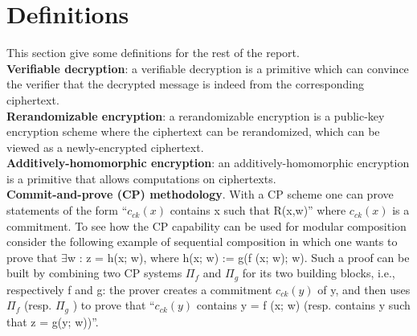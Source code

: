 \section{Definitions}
This section give some definitions for the rest of the report. \\

\textbf{Verifiable decryption}: a verifiable decryption \cite{verifiable_decryption} is a primitive which can convince the verifier that the decrypted message is indeed from the corresponding ciphertext. \\

\textbf{Rerandomizable encryption}: a rerandomizable encryption \cite{rerandomizable_rcca_encryption} is a public-key encryption scheme where the ciphertext can be rerandomized, which can be viewed as a newly-encrypted ciphertext. \\

\textbf{Additively-homomorphic encryption}: an additively-homomorphic encryption is a primitive that allows computations on ciphertexts. \\

\textbf{Commit-and-prove (CP) methodology}. With a CP scheme one can
prove statements of the form “$c_{ck}(x)$ contains x such that R(x,w)” where $c_{ck}(x)$ is a commitment.
To see how the CP capability can be used for modular composition consider the following example of sequential composition in which one wants to prove that $\exists$w : z = h(x; w), where h(x; w) := g(f (x; w); w). Such a proof can be built by combining two CP systems $\Pi_f$ and $\Pi_g$ for its two building blocks, i.e., respectively f and g: the prover creates a commitment $c_{ck}(y)$ of y, and then uses $\Pi_f$ (resp. $\Pi_g$ ) to prove that “$c_{ck}(y)$ contains y = f (x; w) (resp. contains y such that z = g(y; w))”. \\

